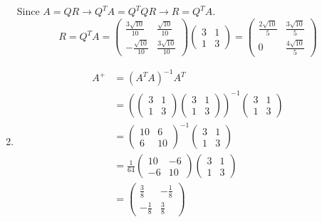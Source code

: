 \documentclass[11pt]{article} %
\begin{document}
\begin{enumerate}
Since $A=QR\longrightarrow Q^TA=Q^TQR\rightarrow R=Q^TA$. 
$$R=Q^TA=\begin{pmatrix}
\frac{3\sqrt{10}}{10}&\frac{\sqrt{10}}{10}\\
-\frac{\sqrt{10}}{10}&\frac{3\sqrt{10}}{10}
\end{pmatrix}\begin{pmatrix}
3&1\\1&3
\end{pmatrix}=\begin{pmatrix}
\frac{2\sqrt{10}}{5}&\frac{3\sqrt{10}}{5}\\0&\frac{4\sqrt{10}}{5}
\end{pmatrix}$$

\item 

\begin{align*}
A^+&=(A^TA)^{-1}A^T\\
&=(\begin{pmatrix}
	3&1\\1&3
\end{pmatrix}\begin{pmatrix}
3&1\\1&3
\end{pmatrix})^{-1}\begin{pmatrix}
3&1\\1&3
\end{pmatrix}\\
&=\begin{pmatrix}
	10&6\\6&10
\end{pmatrix}^{-1}\begin{pmatrix}
3&1\\1&3
\end{pmatrix}\\
&=\frac{1}{64}\begin{pmatrix}
	10&-6\\-6&10
\end{pmatrix}\begin{pmatrix}
3&1\\1&3
\end{pmatrix}\\
&=\begin{pmatrix}
	\frac{3}{8}&-\frac{1}{8}\\
	-\frac{1}{8}&\frac{3}{8}
\end{pmatrix}
\end{align*}


\end{enumerate}
\end{document}
